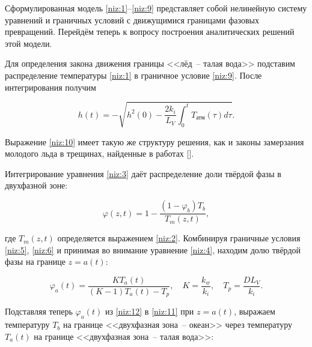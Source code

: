 Сформулированная модель \eqref{niz:1}--\eqref{niz:9} представляет собой нелинейную систему уравнений и граничных условий с движущимися границами фазовых превращений. Перейдём теперь к вопросу построения аналитических решений этой модели.



\smallskip



 Для определения закона движения границы <<лёд~-- талая вода>> подставим распределение температуры \eqref{niz:1} в граничное условие \eqref{niz:9}. После интегрирования получим

\begin{equation}

h(t)=-\sqrt{h^2(0)-\frac{2k_i}{L_V}\int_0^t{T_{\text{атм}}(\tau)d\tau}}.

\label{niz:10}

\end{equation}

Выражение \eqref{niz:10} имеет такую же структуру решения, как и законы замерзания молодого льда в трещинах, найденные в работах [].



Интегрирование уравнения \eqref{niz:3} даёт распределение доли твёрдой фазы в двухфазной зоне:

\begin{equation}

\varphi(z,t)=1-\frac{(1-\varphi_b)T_b}{T_m(z,t)},

\label{niz:11}

\end{equation}

где $T_m(z,t)$ определяется выражением \eqref{niz:2}. Комбинируя граничные условия \eqref{niz:5}, \eqref{niz:6} и принимая во внимание уравнение \eqref{niz:4}, находим долю твёрдой фазы на границе $z=a(t)$:

\begin{equation}

\varphi_a(t)=\frac{KT_a(t)}{(K-1)T_a(t)-T_p}, \quad K=\frac{k_w}{k_i}, \quad T_p=\frac{DL_V}{k_i}.

\label{niz:12}

\end{equation}

Подставляя теперь $\varphi_a(t)$ из \eqref{niz:12} в \eqref{niz:11} при $z=a(t)$, выражаем температуру $T_b$ на границе <<двухфазная зона~-- океан>> через температуру $T_a(t)$ на границе <<двухфазная зона~-- талая вода>>:

